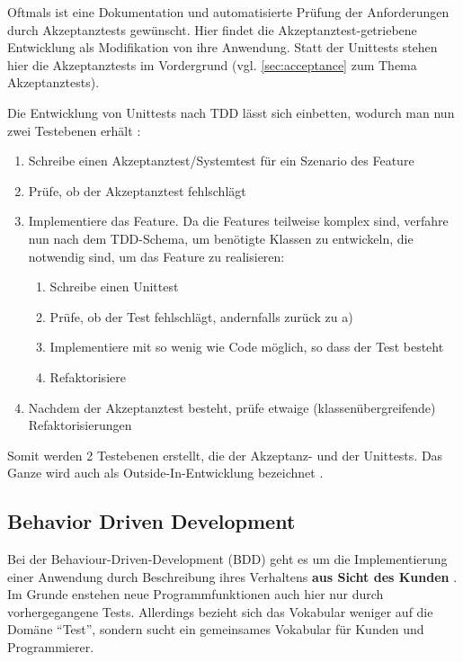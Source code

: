 Oftmals ist eine Dokumentation und automatisierte Prüfung der Anforderungen durch Akzeptanztests gewünscht. Hier findet die Akzeptanztest-getriebene Entwicklung als Modifikation von  ihre Anwendung. Statt der Unittests stehen hier die Akzeptanztests im Vordergrund (vgl. \ref{sec:acceptance} zum Thema Akzeptanztests).


Die Entwicklung von Unittests nach TDD lässt sich einbetten, wodurch man nun zwei Testebenen erhält \citep[S. 285]{chelimsky_rspec_2010}:

\begin{enumerate}
 \item Schreibe einen Akzeptanztest/Systemtest für ein Szenario des Feature
 \item Prüfe, ob der Akzeptanztest fehlschlägt

 \item Implementiere das Feature. Da die Features teilweise komplex sind, verfahre nun nach dem TDD-Schema, um benötigte Klassen zu entwickeln, die notwendig sind, um das Feature zu realisieren:
 \begin{enumerate}
   \item Schreibe einen Unittest
   \item Prüfe, ob der Test fehlschlägt, andernfalls zurück zu a)
   \item Implementiere mit so wenig wie Code möglich, so dass der Test besteht
   \item Refaktorisiere
 \end{enumerate}

 \item Nachdem der Akzeptanztest besteht, prüfe etwaige (klassenübergreifende) Refaktorisierungen

\end{enumerate}

Somit werden 2 Testebenen erstellt, die der Akzeptanz- und der Unittests. Das Ganze wird auch als Outside-In-Entwicklung bezeichnet \citep{chelimsky_rspec_2010}.

\subsection{Behavior Driven Development}
\label{sec:tddBdd}
Bei der Behaviour-Driven-Development (BDD) geht es um die Implementierung einer Anwendung durch Beschreibung ihres Verhaltens \textbf{aus Sicht des Kunden} \citep[S. 138]{chelimsky_rspec_2010}. Im Grunde enstehen neue Programmfunktionen auch hier nur durch vorhergegangene Tests. Allerdings bezieht sich das Vokabular weniger auf die Domäne "`Test"', sondern sucht ein gemeinsames Vokabular für Kunden und Programmierer.

